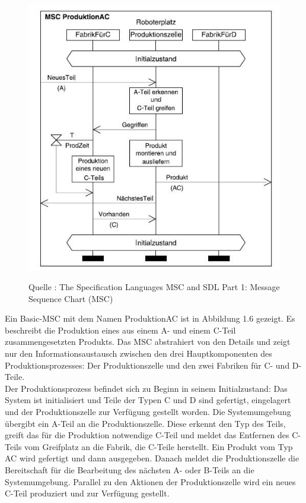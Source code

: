 \begin{center}
\begin{figure}[h]
   

\includegraphics[scale=1]{Graphics/MSC1.jpg}



Quelle : The Specification Languages MSC and SDL
Part 1: Message Sequence Chart (MSC) 

 
\label{fig7}


\end{figure}

\end{center}
\newpage
Ein Basic-MSC mit dem Namen ProduktionAC ist in
Abbildung 1.6 gezeigt. Es beschreibt die Produktion eines aus einem
A- und einem C-Teil zusammengesetzten Produkts.
Das MSC abstrahiert von den Details und zeigt nur den Informationsaustausch
zwischen den drei Hauptkomponenten
des Produktionsprozesses: Der Produktionszelle und den
zwei Fabriken für C- und D-Teile.
\\
Der Produktionsprozess befindet sich zu Beginn in seinem
Initialzustand: Das System ist initialisiert und Teile
der Typen C und D sind gefertigt, eingelagert und der
Produktionszelle zur Verfügung gestellt worden. Die Systemumgebung
übergibt ein A-Teil an die Produktionszelle.
Diese erkennt den Typ des Teils, greift das für die Produktion
notwendige C-Teil und meldet das Entfernen des
C-Teils vom Greifplatz an die Fabrik, die C-Teile herstellt.
Ein Produkt vom Typ AC wird gefertigt und dann
ausgegeben. Danach meldet die Produktionszelle die Bereitschaft
für die Bearbeitung des nächsten A- oder B-Teils
an die Systemumgebung. Parallel zu den Aktionen der Produktionszelle
wird ein neues C-Teil produziert und zur
Verfügung gestellt.\\
